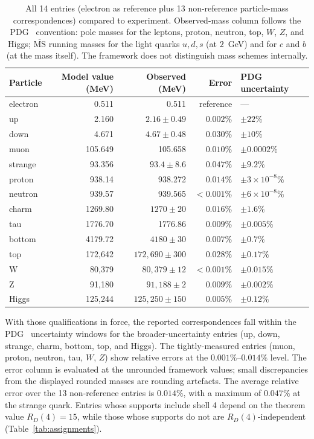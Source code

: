 \documentclass[12pt]{article}
\begin{document}
\begin{table}[ht]
\centering
\caption{All 14 entries (electron as reference plus 13 non-reference particle-mass correspondences) compared to experiment. Observed-mass column follows the PDG~\citep{Workman2022} convention: pole masses for the leptons, proton, neutron, top, $W$, $Z$, and Higgs; $\overline{\mathrm{MS}}$ running masses for the light quarks $u, d, s$ (at $2$~GeV) and for $c$ and $b$ (at the mass itself). The framework does not distinguish mass schemes internally.}
\label{tab:results}
\begin{tabular}{@{}lrrrl@{}}
\toprule
Particle & Model value (MeV) & Observed (MeV) & Error & PDG uncertainty \\
\midrule
electron & 0.511 & 0.511 & reference & --- \\
up & 2.160 & $2.16 \pm 0.49$ & $0.002\%$ & $\pm 22\%$ \\
down & 4.671 & $4.67 \pm 0.48$ & $0.030\%$ & $\pm 10\%$ \\
muon & 105.649 & 105.658 & $0.010\%$ & $\pm 0.0002\%$ \\
strange & 93.356 & $93.4 \pm 8.6$ & $0.047\%$ & $\pm 9.2\%$ \\
proton & 938.14 & 938.272 & $0.014\%$ & $\pm 3 \times 10^{-8}\%$ \\
neutron & 939.57 & 939.565 & $< 0.001\%$ & $\pm 6 \times 10^{-8}\%$ \\
charm & 1269.80 & $1270 \pm 20$ & $0.016\%$ & $\pm 1.6\%$ \\
tau & 1776.70 & 1776.86 & $0.009\%$ & $\pm 0.005\%$ \\
bottom & 4179.72 & $4180 \pm 30$ & $0.007\%$ & $\pm 0.7\%$ \\
top & 172{,}642 & $172{,}690 \pm 300$ & $0.028\%$ & $\pm 0.17\%$ \\
W & 80{,}379 & $80{,}379 \pm 12$ & $< 0.001\%$ & $\pm 0.015\%$ \\
Z & 91{,}180 & $91{,}188 \pm 2$ & $0.009\%$ & $\pm 0.002\%$ \\
Higgs & 125{,}244 & $125{,}250 \pm 150$ & $0.005\%$ & $\pm 0.12\%$ \\
\bottomrule
\end{tabular}
\end{table}

With those qualifications in force, the reported correspondences fall within the PDG~\citep{Workman2022} uncertainty windows for the broader-uncertainty entries (up, down, strange, charm, bottom, top, and Higgs). The tightly-measured entries (muon, proton, neutron, tau, $W$, $Z$) show relative errors at the $0.001\%$--$0.014\%$ level. The error column is evaluated at the unrounded framework values; small discrepancies from the displayed rounded masses are rounding artefacts. The average relative error over the 13 non-reference entries is $0.014\%$, with a maximum of $0.047\%$ at the strange quark. Entries whose supports include shell 4 depend on the theorem value $R_D(4) = 15$, while those whose supports do not are $R_D(4)$-independent (Table~\ref{tab:assignments}).
\end{document}
